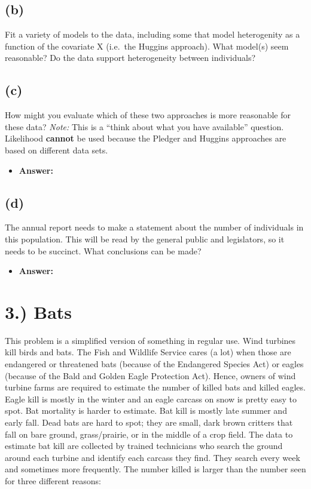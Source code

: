 \documentclass[]{article}
\providecommand{\tightlist}{%
  \setlength{\itemsep}{0pt}\setlength{\parskip}{0pt}}
\begin{document}
\subsection{(b)}\label{b-1}

Fit a variety of models to the data, including some that model
heterogenity as a function of the covariate X (i.e.~the Huggins
approach). What model(s) seem reasonable? Do the data support
heterogeneity between individuals?

\subsection{(c)}\label{c-1}

How might you evaluate which of these two approaches is more reasonable
for these data? \emph{Note:} This is a ``think about what you have
available'' question. Likelihood \textbf{cannot} be used because the
Pledger and Huggins approaches are based on different data sets.

\begin{itemize}
\tightlist
\item
  \textbf{Answer:}
\end{itemize}

\subsection{(d)}\label{d-1}

The annual report needs to make a statement about the number of
individuals in this population. This will be read by the general public
and legislators, so it needs to be succinct. What conclusions can be
made?

\begin{itemize}
\tightlist
\item
  \textbf{Answer:}
\end{itemize}

\section{3.) Bats}\label{bats}

This problem is a simplified version of something in regular use. Wind
turbines kill birds and bats. The Fish and Wildlife Service cares (a
lot) when those are endangered or threatened bats (because of the
Endangered Species Act) or eagles (because of the Bald and Golden Eagle
Protection Act). Hence, owners of wind turbine farms are required to
estimate the number of killed bats and killed eagles. Eagle kill is
mostly in the winter and an eagle carcass on snow is pretty easy to
spot. Bat mortality is harder to estimate. Bat kill is mostly late
summer and early fall. Dead bats are hard to spot; they are small, dark
brown critters that fall on bare ground, grass/prairie, or in the middle
of a crop field. The data to estimate bat kill are collected by trained
technicians who search the ground around each turbine and identify each
carcass they find. They search every week and sometimes more frequently.
The number killed is larger than the number seen for three different
reasons:
\end{document}
